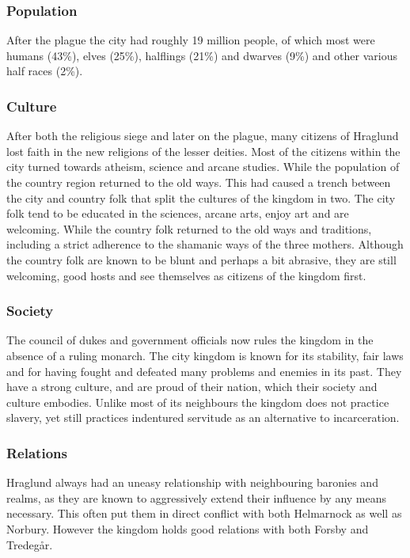 \subsubsection{Population}

After the plague the city had roughly 19 million people, of which most were
humans (43\%), elves (25\%), halflings (21\%) and dwarves (9\%) and other
various half races (2\%).

\subsubsection{Culture}

After both the religious siege and later on the plague, many citizens of
Hraglund lost faith in the new religions of the lesser deities. Most of
the citizens within the city turned towards atheism, science and arcane
studies. While the population of the country region returned to the old
ways. This had caused a trench between the city and country folk that split
the cultures of the kingdom in two. The city folk tend to be educated in
the sciences, arcane arts, enjoy art and are welcoming. While the country folk
returned to the old ways and traditions, including a strict adherence to the
shamanic ways of the three mothers. Although the country folk are known to be
blunt and perhaps a bit abrasive, they are still welcoming, good hosts and see
themselves as citizens of the kingdom first.

\subsubsection{Society}

The council of dukes and government officials now rules the kingdom in the
absence of a ruling monarch. The city kingdom is known for its stability,
fair laws and for having fought and defeated many problems and enemies in
its past. They have a strong culture, and are proud of their nation, which
their society and culture embodies. Unlike most of its neighbours the kingdom
does not practice slavery, yet still practices indentured servitude as an
alternative to incarceration.

\subsubsection{Relations}

Hraglund always had an uneasy relationship with neighbouring baronies
and realms, as they are known to aggressively extend their influence by any
means necessary. This often put them in direct conflict with both
Helmarnock as well as Norbury. However the kingdom holds good
relations with both Forsby and Tredegår.

